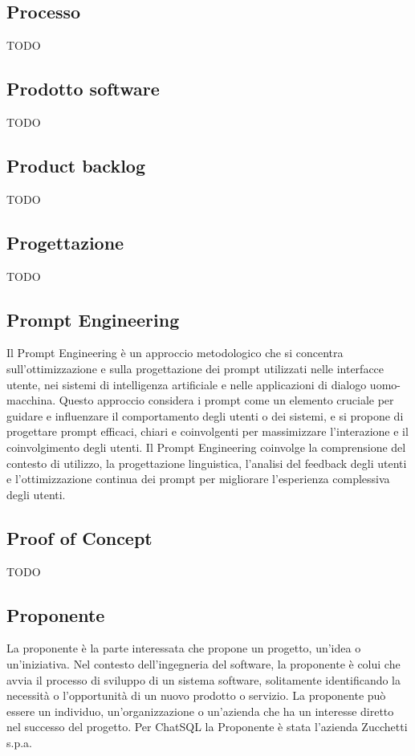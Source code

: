 \vspace{2em}
\subsection*{Processo}
TODO

\vspace{2em}
\subsection*{Prodotto software}
TODO

\vspace{2em}
\subsection*{Product backlog}
TODO

\vspace{2em}
\subsection*{Progettazione}
TODO

\vspace{2em}
\subsection*{Prompt Engineering}
Il Prompt Engineering è un approccio metodologico che si concentra sull'ottimizzazione e sulla progettazione dei prompt utilizzati nelle interfacce utente, nei sistemi di intelligenza artificiale e nelle applicazioni di dialogo uomo-macchina. Questo approccio considera i prompt come un elemento cruciale per guidare e influenzare il comportamento degli utenti o dei sistemi, e si propone di progettare prompt efficaci, chiari e coinvolgenti per massimizzare l'interazione e il coinvolgimento degli utenti. Il Prompt Engineering coinvolge la comprensione del contesto di utilizzo, la progettazione linguistica, l'analisi del feedback degli utenti e l'ottimizzazione continua dei prompt per migliorare l'esperienza complessiva degli utenti.

\vspace{2em}
\subsection*{Proof of Concept}
TODO

\vspace{2em}
\subsection*{Proponente}
La proponente è la parte interessata che propone un progetto, un'idea o un'iniziativa. Nel contesto dell'ingegneria del software, la proponente è colui che avvia il processo di sviluppo di un sistema software, solitamente identificando la necessità o l'opportunità di un nuovo prodotto o servizio. La proponente può essere un individuo, un'organizzazione o un'azienda che ha un interesse diretto nel successo del progetto. Per ChatSQL la Proponente è stata l'azienda Zucchetti s.p.a.

